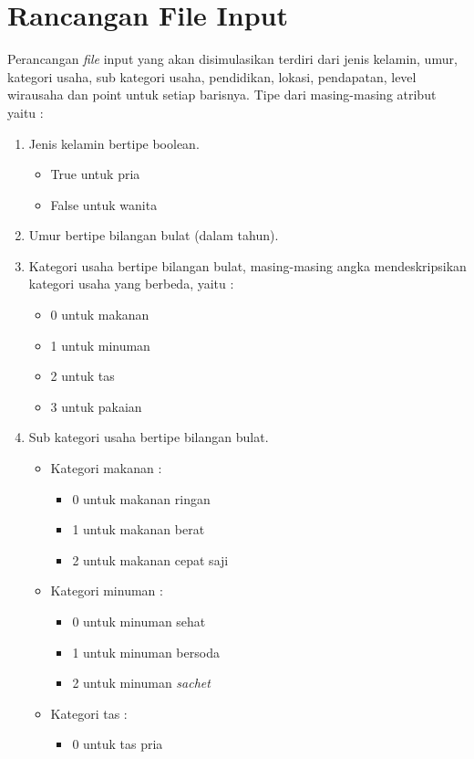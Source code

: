 \section{Rancangan File Input}
Perancangan \textit{file} input yang akan disimulasikan terdiri dari jenis kelamin, umur, kategori usaha, sub kategori usaha, pendidikan, lokasi, pendapatan, level wirausaha dan point untuk setiap barisnya.
Tipe dari masing-masing atribut yaitu :
\begin{enumerate}
	\item Jenis kelamin bertipe boolean.
	\begin{itemize}
		\item True untuk pria
		\item False untuk wanita
	\end{itemize}
	\item Umur bertipe bilangan bulat (dalam tahun).
	\item Kategori usaha bertipe bilangan bulat, masing-masing angka mendeskripsikan kategori usaha yang berbeda, yaitu :
		\begin{itemize}
			\item 0 untuk makanan
			\item 1 untuk minuman
			\item 2 untuk tas
			\item 3 untuk pakaian
		\end{itemize}
	\item Sub kategori usaha bertipe bilangan bulat.
		\begin{itemize}
			\item Kategori makanan :
				\begin{itemize}
					\item 0 untuk makanan ringan
					\item 1 untuk makanan berat
					\item 2 untuk makanan cepat saji
				\end{itemize}
			\item Kategori minuman :
				\begin{itemize}
					\item 0 untuk minuman sehat
					\item 1 untuk minuman bersoda
					\item 2 untuk minuman \textit{sachet}
				\end{itemize}
			\item Kategori tas :
				\begin{itemize}
					\item 0 untuk tas pria

\end{itemize}
\end{itemize}
\end{enumerate}
